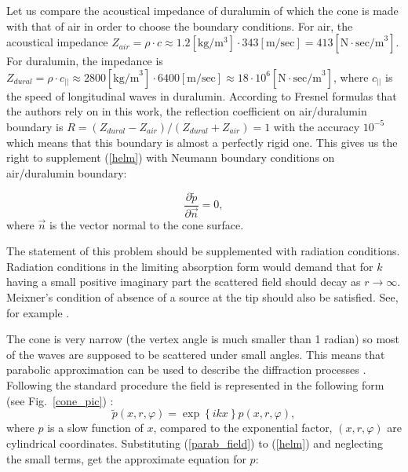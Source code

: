 \documentclass{procDDs}
\begin{document}
Let us compare the acoustical impedance of duralumin of which the cone is made with that of air in order to choose the boundary conditions. For air, the acoustical impedance $Z_{air} = \rho \cdot c \approx 1.2 \left[\textrm{kg}/\textrm{m}^3\right] \cdot 343 \left[\textrm{m/sec}\right] = 413 \left[\textrm{N}\cdot \textrm{sec/m}^3\right]$. For duralumin, the impedance is $Z_{dural} = \rho \cdot c_{||} \approx 2800 \left[\textrm{kg/m}^3\right] \cdot 6400 \left[\textrm{m/sec}\right] \approx 18 \cdot 10^6 \left[\textrm{N}\cdot \textrm{sec/m}^3\right]$, where $c_{||}$ is the speed of longitudinal waves in duralumin. According to Fresnel formulas that the authors rely on in this work, the reflection coefficient on air/duralumin boundary is $R = (Z_{dural} - Z_{air})/(Z_{dural} + Z_{air}) = 1$ with the accuracy $10^{-5}$ which means that this boundary is almost a perfectly rigid one. This gives us the right to supplement (\ref{helm}) with Neumann boundary conditions on air/duralumin boundary:

\begin{equation}
\frac{\partial \tilde{p}}{\partial \vec{n}}=0,
\end{equation}
where $\vec{n}$ is the vector normal to the cone surface. 

The statement of this problem should be supplemented with radiation conditions. Radiation conditions in the limiting absorption form would demand that for $k$ having a small positive imaginary part the scattered field should decay as $r \rightarrow \infty$.
 Meixner's condition of absence of a source at the tip should also be satisfied. See, for example \cite{Smychlyaev}.


The cone is very narrow (the vertex angle is much smaller than 1 radian) so most of the waves are supposed to be scattered under small angles. This means that parabolic approximation can be used to describe the diffraction processes \cite{Shanin_parabolic}. Following the standard procedure the field is represented in the following form (see Fig.~\ref{cone_pic}) :
\begin{equation}
\label{parab_field}                     
\tilde{p}(x,r,\varphi)=\exp\left\lbrace ikx \right\rbrace p(x,r,\varphi),                                         
\end{equation}
where $p$ is a slow function of $x$, compared to the exponential factor, $(x, r, \varphi)$ are cylindrical coordinates. Substituting (\ref{parab_field}) to (\ref{helm}) and neglecting the small terms, get the approximate equation for $p$:
\end{document}
